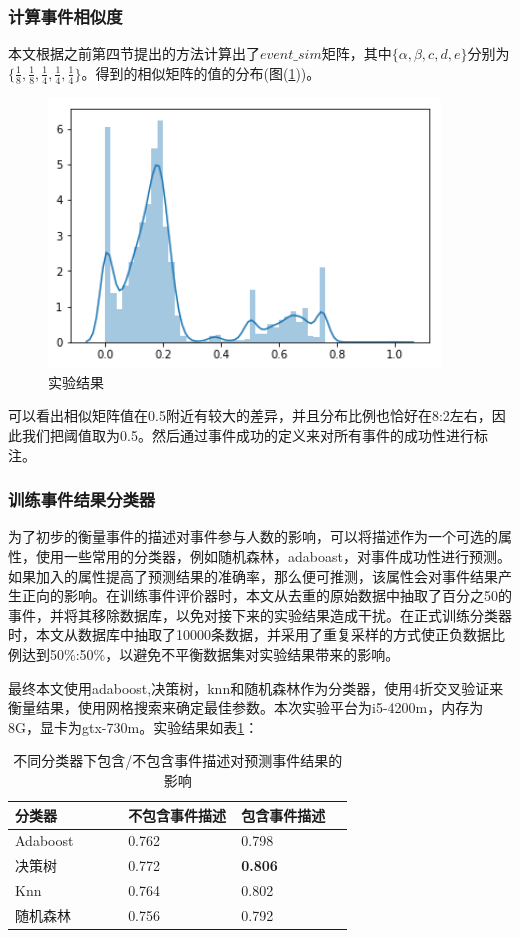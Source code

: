 \subsubsection{计算事件相似度}
本文根据之前第四节提出的方法计算出了\(event\_sim\)矩阵，其中\(\{\alpha,\beta,{c},{d},{e}\}\)分别为\(\{\frac{1}{8},\frac{1}{8},\frac{1}{4},\frac{1}{4},\frac{1}{4}\}\)。得到的相似矩阵的值的分布(图(\ref{f1-1}))。

\begin{figure}[htbp]
  \centering
  \includegraphics[width=10.4cm]{event_sim_dist.png}
  \caption{实验结果}
  \label{f1-1}
\end{figure}

可以看出相似矩阵值在0.5附近有较大的差异，并且分布比例也恰好在8:2左右，因此我们把阈值取为0.5。然后通过事件成功的定义来对所有事件的成功性进行标注。

\subsubsection{训练事件结果分类器}
为了初步的衡量事件的描述对事件参与人数的影响，可以将描述作为一个可选的属性，使用一些常用的分类器，例如随机森林，adaboast，对事件成功性进行预测。如果加入的属性提高了预测结果的准确率，那么便可推测，该属性会对事件结果产生正向的影响。在训练事件评价器时，本文从去重的原始数据中抽取了百分之50的事件，并将其移除数据库，以免对接下来的实验结果造成干扰。在正式训练分类器时，本文从数据库中抽取了10000条数据，并采用了重复采样的方式使正负数据比例达到50\%:50\%，以避免不平衡数据集对实验结果带来的影响。

最终本文使用adaboost,决策树，knn和随机森林作为分类器，使用4折交叉验证来衡量结果，使用网格搜索来确定最佳参数。本次实验平台为i5-4200m，内存为8G，显卡为gtx-730m。实验结果如表\ref{t1-3}：

\begin{table}[htbp] 
  \centering
  \caption{\label{t1-3}不同分类器下包含/不包含事件描述对预测事件结果的影响}
  \begin{tabular*}{\linewidth}{p{0.33\linewidth}p{0.33\linewidth}p{0.33\linewidth}}
\toprule 
分类器&不包含事件描述&包含事件描述\\
\midrule
Adaboost & 0.762 & 0.798 \\
决策树& 0.772 & \textbf{0.806} \\
Knn & 0.764 & 0.802  \\
随机森林 & 0.756 & 0.792 \\
\bottomrule
  \end{tabular*}
\end{table}

